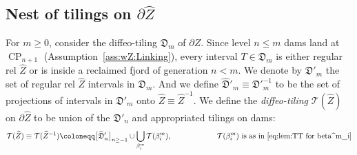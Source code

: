 \documentclass{amsart}
\newcommand{\1}{{\mathbb 1 }}
\newcommand\TT{\mathcal{T}}
\newcommand{\wZ}{{\widehat Z}}
\newcommand{\Dbb}{{\mathfrak{D}}}
\theoremstyle{remark}
\numberwithin{equation}{section}
\theoremstyle{definition}
\newcommand{\CP}{{\operatorname{CP}}}
\begin{document}
\subsection{Nest of tilings on $\partial \wZ$} \label{ss:NestofTilings}For $m\ge 0$, consider the diffeo-tiling $\Dbb_m$ of $\partial Z$. Since level $n\le m$ dams land at $\CP_{n+1}$ (Assumption~\ref{ass:wZ:Linking}), every interval $T\in \Dbb_m$ is either regular rel $\wZ$ or is inside a reclaimed fjord of generation $n< m$. We denote by $\Dbb'_m$ the set of regular rel $\wZ$ intervals in $\Dbb_m$. And we define $\widehat \Dbb'_m\equiv \Dbb'^{-1}_m$ to be the set of projections of intervals in $\Dbb'_m$ onto $\wZ\equiv \wZ^{-1} $. We define the \emph{diffeo-tiling} $\TT(\wZ)$ on $\partial \wZ$ to be union of the $\Dbb'_n$ and appropriated tilings on dams:
\begin{equation}
\label{eq:TT of wZ}
\TT(\wZ)\equiv \TT(\wZ^{-1})\coloneqq \big[\widehat \Dbb'_n\big]_{n\ge -1} \cup \bigcup_{\beta^m_i} \TT(\beta^m_i),\hspace{2cm} \text{ $\TT(\beta^m_i)$ is as in~\eqref{eq:lem:TT for beta^m_i}}
\end{equation} 
\end{document}
